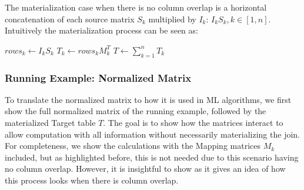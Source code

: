 The materialization case when there is no column overlap is a horizontal concatenation of each source matrix $S_k$ multiplied by $I_k$: $I_k S_k, k \in [1,n]$. Intuitively the materialization process can be seen as:
\begin{algorithmic}
     
    \State $rows_k \gets I_k S_k$ 
    \State $T_k \gets rows_k M^T_k$ 
    \EndFor
    \State $T \gets \sum_{k=1}^{n} T_k$ 
\end{algorithmic}

\subsubsection{Running Example: Normalized Matrix}
\label{subsubsec:2-fac-ml-example}
To translate the normalized matrix to how it is used in ML algorithms, we first show the full normalized matrix of the running example, followed by the materialized Target table $T$. The goal is to show how the matrices interact to allow computation with all information without necessarily materializing the join. For completeness, we show the calculations with the Mapping matrices $M_k$ included, but as highlighted before, this is not needed due to this scenario having no column overlap. However, it is insightful to show as it gives an idea of how this process looks when there is column overlap.
